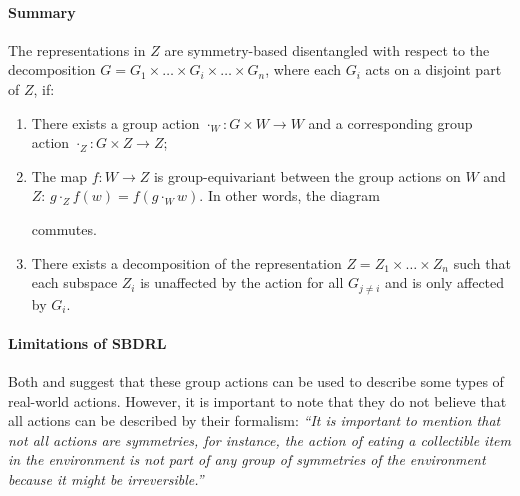 \paragraph{Summary}
The representations in $Z$ are symmetry-based disentangled with respect to the decomposition $G = G_1 \times \hdots \times G_i \times \hdots \times G_n$, where each $G_i$ acts on a disjoint part of $Z$, if:
\begin{enumerate}
    \item There exists a group action $\cdot_{W}: G \times W \to W$ and a corresponding group action $\cdot_{Z}: G \times Z \to Z$;
    \item The map $f : W \to Z$ is group-equivariant between the group actions on $W$ and $Z$: $g \cdot_{Z} f(w) = f(g \cdot_{W} w)$. In other words, the diagram
    
    commutes.    

    \item There exists a decomposition of the representation $Z = Z_1 \times \hdots \times Z_n$ such that each subspace $Z_i$ is unaffected by the action for all $G_{j \neq i}$ and is only affected by $G_i$.
\end{enumerate}

\paragraph{Limitations of SBDRL}
Both \cite{Higgins2018} and \cite{caselles2019symmetry} suggest that these group actions can be used to describe some types of real-world actions.
However, it is important to note that they do not believe that all actions can be described by their formalism: \textit{``It is important to mention that not all actions are symmetries, for instance, the action of eating a collectible item in the environment is not part of any group of symmetries of the environment because it might be irreversible.''}


